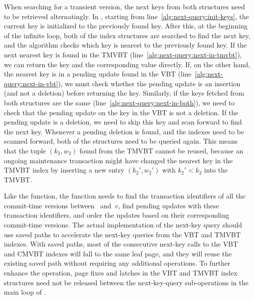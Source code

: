 When searching for a transient version, the next keys from both structures
need to be retrieved alternatingly. 
In , starting from 
line~\ref{alg:next-query:init-keys}, the current key is initialized to the
previously found key. 
After this, at the beginning of the infinite loop, both of the index
structures are searched to find the next key, and the algorithm checks which
key is nearest to the previously found key. 
If the next nearest key is found in the TMVBT
(line~\ref{alg:next-query:next-in-tmvbt}), we can return the key and
the corresponding value directly. 
If, on the other hand, the nearest key is in a pending update found in the
VBT (line~\ref{alg:next-query:next-in-vbt}), we must check whether the
pending update is an insertion (and not a deletion) before returning the key.
Similarly, if the keys fetched from both structures are the same
(line~\ref{alg:next-query:next-in-both}), we need to check that the
pending update on the key in the VBT is not a deletion.
If the pending update is a deletion, we need to skip this key and scan
forward to find the next key.
Whenever a pending deletion is found, and the indexes need to be scanned
forward, both of the structures need to be queried again.
This means that the tuple $(k_2, w_2)$ found from the TMVBT cannot be reused,
because an ongoing maintenance transaction might have changed the nearest key
in the TMVBT index by inserting a new entry $(k_2', w_2')$ with $k_2' < k_2$
into the TMVBT\@.

Like the  function, the 
function needs to find the transaction identifiers of all the commit-time
versions between \stablever\ and~$v$, find pending updates with these
transaction identifiers, and order the updates based on their corresponding
commit-time versions.
The actual implementation of the next-key query should use saved paths to
accelerate the next-key queries from the VBT and TMVBT indexes.
With saved paths, most of the consecutive next-key calls to the VBT and CMVBT
indexes will fall to the same leaf page, and they will reuse the existing
saved path without requiring any additional  operations.
To further enhance the operation, page fixes and latches in the VBT and TMVBT
index structures need not be released between the next-key-query
sub-operations in the main loop of .

